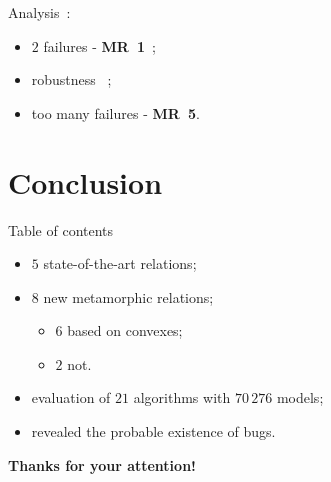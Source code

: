 \documentclass[aspectratio=169,dvipsnames]{beamer}
\newcommand{\cmark}{{\color{ForestGreen}{\ding{51}}}}
\begin{document}
\begin{frame}{\secname}
\begin{minipage}{0.3\textwidth}
		\vspace{\baselineskip}
		Analysis~:
		\begin{itemize}
			\item $2$ failures - \textbf{MR~1}~;
			\item robustness \cmark~;
			\item too many failures - \textbf{MR~5}.
		\end{itemize}
	\end{minipage}
\end{frame}


\section{Conclusion}

\begin{frame}{Table of contents}
	\tableofcontents[currentsection]
\end{frame}

\begin{frame}{\secname}
	\begin{itemize}
		\item $5$ state-of-the-art relations;
		\item $8$ new metamorphic relations;
		\begin{itemize}
			\item $6$ based on convexes;
			\item $2$ not.
		\end{itemize}
		\item evaluation of $21$ algorithms with $70\,276$ models;
		\item revealed the probable existence of bugs.
	\end{itemize}
\end{frame}

\begin{frame}
	\begin{center}
		\Large
		\textbf{Thanks for your attention!}
	\end{center}
\end{frame}
\end{document}

